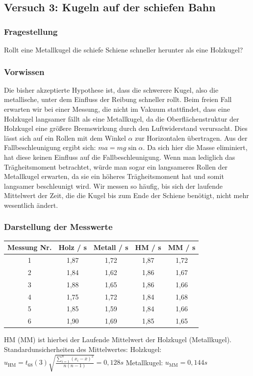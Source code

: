 \documentclass[
	a4paper,
	12pt,
	pagesize,
	ngerman
]{scrartcl}
\begin{document}
	\subsection{Versuch 3: Kugeln auf der schiefen Bahn}
	\subsubsection{Fragestellung}
	Rollt eine Metallkugel die schiefe Schiene schneller herunter als eine Holzkugel?
	\subsubsection{Vorwissen}
	Die bisher akzeptierte Hypothese ist, dass die schwerere Kugel, also die metallische, unter dem Einfluss der Reibung schneller rollt. Beim freien Fall erwarten wir bei einer Messung, die nicht im Vakuum stattfindet, dass eine Holzkugel langsamer fällt als eine Metallkugel, da die Oberflächenstruktur der Holzkugel eine größere Bremswirkung durch den Luftwiderstand verursacht. Dies lässt sich auf ein Rollen mit dem Winkel $\alpha$ zur Horizontalen übertragen. Aus der Fallbeschleunigung ergibt sich: 
	$ma=mg \sin \alpha$.
	Da sich hier die Masse eliminiert, hat diese keinen Einfluss auf die Fallbeschleunigung. Wenn man lediglich das Trägheitsmoment betrachtet, würde man sogar ein langsameres Rollen der Metallkugel erwarten, da sie ein höheres Trägheitsmoment hat und somit langsamer beschleunigt wird.
	Wir messen so häufig, bis sich der laufende Mittelwert der Zeit, die die Kugel bis zum Ende der Schiene benötigt, nicht mehr wesentlich ändert.
	\subsubsection{Darstellung der Messwerte}
	
	\begin{tabular}{| c | c | c | c | c |} \hline
		Messung Nr. & Holz  / \si{s} & Metall  / \si{s} & HM  / \si{s} & MM  / \si{s}\\ \hline
		1 & 1,87&1,72&1,87&1,72\\
		2 & 1,84&1,62&1,86&1,67\\
		3 & 1,88&1,65&1,86&1,66\\
		4 & 1,75&1,72&1,84&1,68\\
		5 & 1,85&1,59&1,84&1,66\\
		6 & 1,90&1,69&1,85&1,65\\
		\hline
	\end{tabular}
	\newline
	HM (MM) ist hierbei der Laufende Mittelwert der Holzkugel (Metallkugel). \newline
	Standardunsicherheiten des Mittelwertes: \newline
	Holzkugel: $u_\text{HM}=t_{68}(3)\sqrt{\frac{\sum_{i=1}^{n} (x_i-\overline{x})^2}{n(n-1)}}=0,128 \si{s}$ \newline
	Metallkugel: $u_\text{MM}=0,144\si{s}$
	
\end{document}
